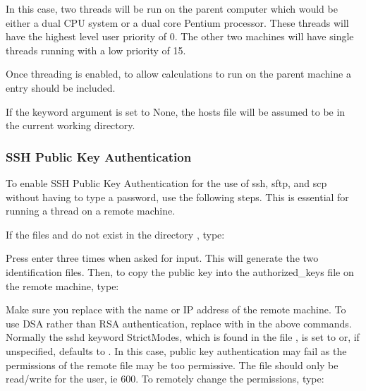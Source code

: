 In this case, two threads will be run on the parent computer which would be either a dual
CPU system or a dual core 
 Pentium processor.  These threads will have the
highest level user priority of 0.  The other two machines will have single threads running
with a low priority of 15.

Once threading is enabled, to allow calculations to run on the parent machine a 
entry should be included.


If the keyword argument 
 is set to None, the hosts file will be assumed to be in the
current working directory.


\subsubsection{SSH Public Key Authentication}

To enable SSH Public Key Authentication for the use of ssh, sftp, and scp without having to
type a password, use the following steps.  This is essential for running a thread on a
remote machine.

If the files 
 and 
 do not exist in the directory 
, type:



Press enter three times when asked for input.  This will generate the two identification
files.  Then, to copy  the public key into the authorized\_keys file on the remote machine,
type:



Make sure you replace 
 with the name or IP address of the remote machine.  To use
DSA rather than RSA authentication, replace 
 with 
 in the above commands.
Normally the sshd keyword StrictModes, which is found in the file 
, is
set to 
 or, if unspecified, defaults to 
.  In this case, public key authentication
may fail as the permissions of the remote file 
 may be too
permissive.  The file should only be read/write  for the user, ie 600.  To remotely change
the permissions, type:



